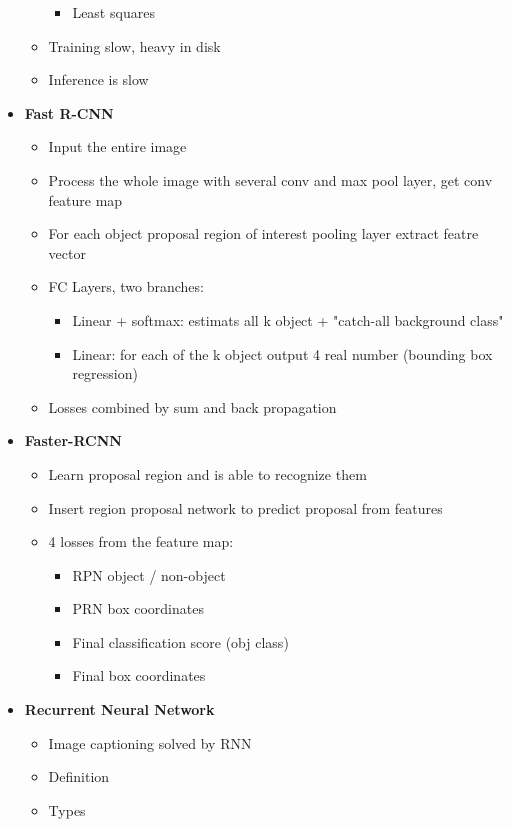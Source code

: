 \documentclass[12pt,oneside]{report}
\begin{document}
\begin{itemize}
\begin{itemize}
\begin{itemize}
            \item Least squares
        \end{itemize}
        \item Training slow, heavy in disk
        \item Inference is slow
    \end{itemize}
    \item \textbf{Fast R-CNN}
    \begin{itemize}
        \item Input the entire image
        \item Process the whole image with several conv and max pool layer, get conv feature map
        \item For each object proposal region of interest pooling layer extract featre vector
        \item FC Layers, two branches:
        \begin{itemize}
            \item Linear + softmax: estimats all k object + "catch-all background class"
            \item Linear: for each of the k object output 4 real number (bounding box regression)
        \end{itemize}
        \item Losses combined by sum and back propagation
    \end{itemize}
    \item \textbf{Faster-RCNN}
    \begin{itemize}
        \item Learn proposal region and is able to recognize them
        \item Insert region proposal network to predict proposal from features
        \item 4 losses from the feature map:
        \begin{itemize}
            \item RPN object / non-object
            \item PRN box coordinates
            \item Final classification score (obj class)
            \item Final box coordinates
        \end{itemize}
    \end{itemize}
    \item \textbf{Recurrent Neural Network}
    \begin{itemize}
        \item Image captioning solved by RNN
        \item Definition
        \item Types
    \end{itemize}
\end{itemize}
\end{document}
